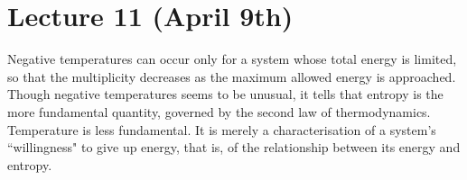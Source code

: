 \section{Lecture 11 (April 9th)}
\begin{rmk}
Negative temperatures can occur only for a system whose total energy is limited, so that the multiplicity decreases as the maximum allowed energy is approached. Though negative temperatures seems to be unusual, it tells that entropy is the more fundamental quantity, governed by the second law of thermodynamics. Temperature is less fundamental. It is merely a characterisation of a system's ``willingness" to give up energy, that is, of the relationship between its energy and entropy.
\end{rmk}
\vspace{2ex}

